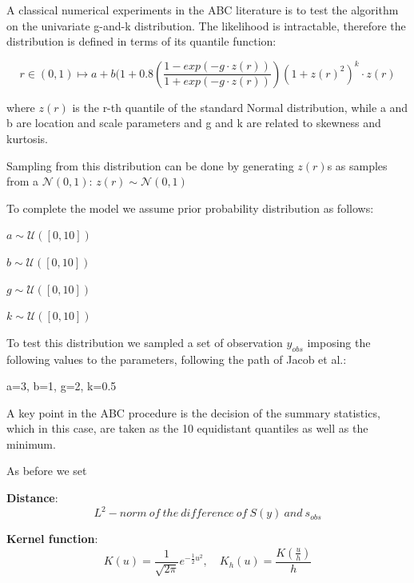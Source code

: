 \documentclass[11pt,a4paper,oneside]{report}
\begin{document}
A classical numerical experiments in the ABC literature is to test the algorithm on the univariate g-and-k distribution.
The likelihood is intractable, therefore the distribution is defined in terms of its quantile function:

\begin{center}
	
	$$ r \in (0,1) \longmapsto   a + b (1+0.8\left(\frac{1-exp(-g \cdot z(r))}{1+exp(-g\cdot z(r))}\right)(1+ z(r)^{2})^k\cdot z(r)  $$
\end{center}



where $z(r)$ is the r-th quantile of the standard Normal distribution,
while a and b are location and scale parameters and g and k are related to skewness and kurtosis.


Sampling from this distribution can be done by generating $z(r)$s as samples from a $\mathcal{N}(0,1)$: 
$z(r) \sim \mathcal{N}(0,1)$

To complete the model we assume prior probability distribution as follows:
\begin{center}
	$ a \sim \mathcal{U}([0,10])$
	
	$ b \sim \mathcal{U}([0,10])$
	
	$ g \sim \mathcal{U}([0,10])$
	
	$ k \sim \mathcal{U}([0,10])$
\end{center}


To test this distribution we sampled a set of observation $y_{obs}$ imposing the following values to the parameters, following the path of Jacob et al.:

a=3, b=1, g=2, k=0.5

A key point in the ABC procedure is the decision of the summary statistics, which in this case, are taken as the 10 equidistant quantiles as well as the minimum.

As before we set 

\textbf{Distance}: 
$$L^2-norm\ of\ the\ difference\ of\ S(y)\ and\ s_{obs}$$

\textbf{Kernel function}: 
$$
K(u) = 
\frac{1}{\sqrt{2\pi}} e^{-\frac{1}{2}u^2}, 
\quad K_h(u) 
= \frac{K(\frac u h)}{h}
$$
\end{document}
